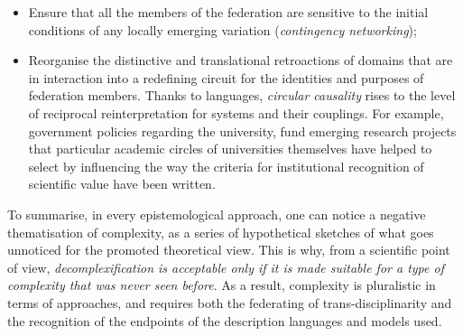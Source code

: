 \documentclass[output=paper]{langscibook}
\begin{document}
\begin{itemize}
\item Ensure that all the members of the federation are sensitive to the initial conditions of any locally emerging variation (\textit{contingency networking});
\item Reorganise the distinctive and translational retroactions of domains that are in interaction into a redefining circuit for the identities and purposes of federation members. Thanks to languages, \textit{circular causality} rises to the level of reciprocal reinterpretation for systems and their couplings. For example, government policies regarding the university, fund emerging research projects that particular academic circles of universities themselves have helped to select by influencing the way the criteria for institutional recognition of scientific value have been written.
\end{itemize}

To summarise, in every epistemological approach, one can notice a negative thematisation of complexity, as a series of hypothetical sketches of what goes unnoticed for the promoted theoretical view. This is why, from a scientific point of view, \textit{decomplexification is acceptable only if it is made suitable for a type of complexity that was never seen before}. As a result, complexity is pluralistic in terms of approaches, and requires both the federating of trans-disciplinarity and the recognition of the endpoints of the description languages and models used.
\end{document}
